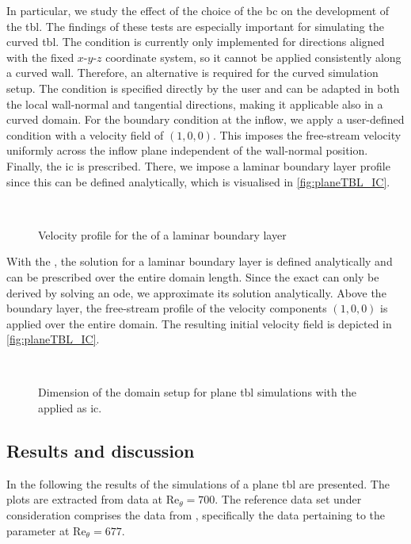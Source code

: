 In particular, we study the effect of the choice of the \acrshort{bc} on the development of the \acrshort{tbl}.
The findings of these tests are especially important for simulating the curved \acrshort{tbl}.
The  condition  is currently only implemented for directions aligned with the fixed $x\text{-}y\text{-}z$ coordinate system, so it cannot be applied consistently along a curved wall.
Therefore, an alternative is required for the curved simulation setup.
The  condition is specified directly by the user and can be adapted in both the local wall-normal and tangential directions, making it applicable also in a curved domain.
For the boundary condition at the inflow, we apply a user-defined  condition with a velocity field of $(1, 0 ,0)$.
This imposes the free-stream velocity uniformly across the inflow plane independent of the wall-normal position.
Finally, the \acrshort{ic} is prescribed.
There, we impose a laminar boundary layer profile since this can be defined analytically, which is visualised in \autoref{fig:planeTBL_IC}.

\begin{figure}[h!]
    \centering
    
    \\[0pt]
    \caption{Velocity profile for the  of a laminar boundary layer}
    \label{fig:BlasiusIC}
\end{figure}


With the , the solution for a laminar boundary layer is defined analytically and can be prescribed over the entire domain length. 
Since the exact  can only be derived by solving an \acrfull{ode}, we approximate its solution analytically.
Above the boundary layer, the free-stream profile of the velocity components $(1, 0, 0)$ is applied over the entire domain.
The resulting initial velocity field is depicted in \autoref{fig:planeTBL_IC}.

\begin{figure}[H]
    \centering
    
    \\[-15pt]
    \caption{Dimension of the domain setup for plane \acrshort{tbl} simulations with the applied  as \acrshort{ic}.}
    \label{fig:planeTBL_IC}
\end{figure}

\subsection{Results and discussion} \label{subsec:planeTBLResults}
In the following the results of the simulations of a plane \acrshort{tbl} are presented.
The plots are extracted from data at $\mathrm{Re}_{\theta} = 700$.
The reference data set under consideration comprises the data from \citet{schlatter_assessment_2010}, specifically the data pertaining to the parameter at $\mathrm{Re}_{\theta} = 677$.


